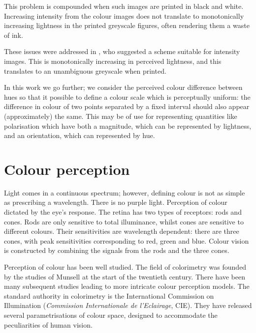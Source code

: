 \documentclass[useAMS,usedcolumn,usegraphicx,usenatbib]{mn2e}
\begin{document}
This problem is compounded when such images are printed in black and white. Increasing intensity from the colour images does not translate to monotonically increasing lightness in the printed greyscale figures, often rendering them a waste of ink.

These issues were addressed in \citet{Green2011}, who suggested a scheme suitable for intensity images. This is monotonically increasing in perceived lightness, and this translates to an unambiguous greyscale when printed.

In this work we go further; we consider the perceived colour difference between hues so that it possible to define a colour scale which is perceptually uniform: the difference in colour of two points separated by a fixed interval should also appear (approximately) the same. This may be of use for representing quantities like polarisation which have both a magnitude, which can be represented by lightness, and an orientation, which can represented by hue.

\section{Colour perception}

Light comes in a continuous spectrum; however, defining colour is not as simple as prescribing a wavelength. There is no purple light. Perception of colour dictated by the eye's response. The retina has two types of receptors: rods and cones. Rods are only sensitive to total illuminance, whilst cones are sensitive to different colours. Their sensitivities are wavelength dependent: there are three cones, with peak sensitivities corresponding to red, green and blue. Colour vision is constructed by combining the signals from the rods and the three cones.

Perception of colour has been well studied. The field of colorimetry was founded by the studies of Munsell at the start of the twentieth century. There have been many subsequent studies leading to more intricate colour perception models. The standard authority in colorimetry is the International Commission on Illumination (\textit{Commission Internationale de l'Eclairage}, CIE). They have released several parametrisations of colour space, designed to accommodate the peculiarities of human vision.
\end{document}
